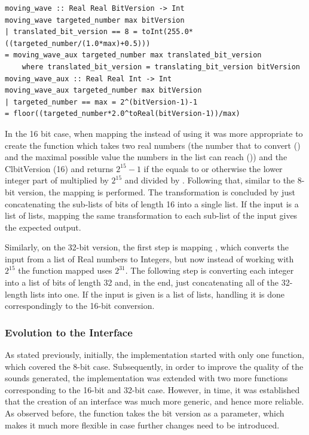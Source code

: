 \documentclass[runningheads]{llncs}
\begin{document}
\begin{lstlisting}[language=Clean,label={cod:mv},caption={
The \Cl{moving\_wave} function}, captionpos=b]
moving_wave :: Real Real BitVersion -> Int
moving_wave targeted_number max bitVersion
| translated_bit_version == 8 = toInt(255.0*((targeted_number/(1.0*max)+0.5)))
= moving_wave_aux targeted_number max translated_bit_version
    where translated_bit_version = translating_bit_version bitVersion
moving_wave_aux :: Real Real Int -> Int
moving_wave_aux targeted_number max bitVersion
| targeted_number == max = 2^(bitVersion-1)-1
= floor((targeted_number*2.0^toReal(bitVersion-1))/max)
\end{lstlisting}
In the 16 bit case, when mapping the  instead of using  it was more appropriate to create the function  which takes two real numbers (the number that  to convert () and the maximal possible value the numbers in the list can reach ()) and the Cl{bitVersion} (16) and returns $2^{15}-1$ if the  equals to  or otherwise the lower integer part of  multiplied by $2^{15}$ and divided by . Following that, similar to the 8-bit version, the  mapping is performed. The transformation is concluded by just concatenating the sub-lists of bits of length 16 into a single list. If the input is a list of lists, mapping the same transformation to each sub-list of the input gives the expected output.

Similarly, on the 32-bit version, the first step is mapping , which converts the input from a list of Real numbers to Integers, but now instead of working with $2^{15}$ the function mapped uses $2^{31}$. The following step is converting each integer into a list of bits of length 32 and, in the end, just concatenating all of the 32-length lists into one. If the input is given is a list of lists, handling it is done correspondingly to the 16-bit conversion.


\subsubsection{Evolution to the Interface}
As stated previously, initially, the implementation started with only one function, which covered the 8-bit case. Subsequently, in order to improve the quality of the sounds generated, the implementation was extended with two more functions corresponding to the 16-bit and 32-bit case. However, in time, it was established that the creation of an interface was much more generic, and hence more reliable. As observed before, the function  takes the bit version as a parameter, which makes it much more flexible in case further changes need to be introduced.
\end{document}
